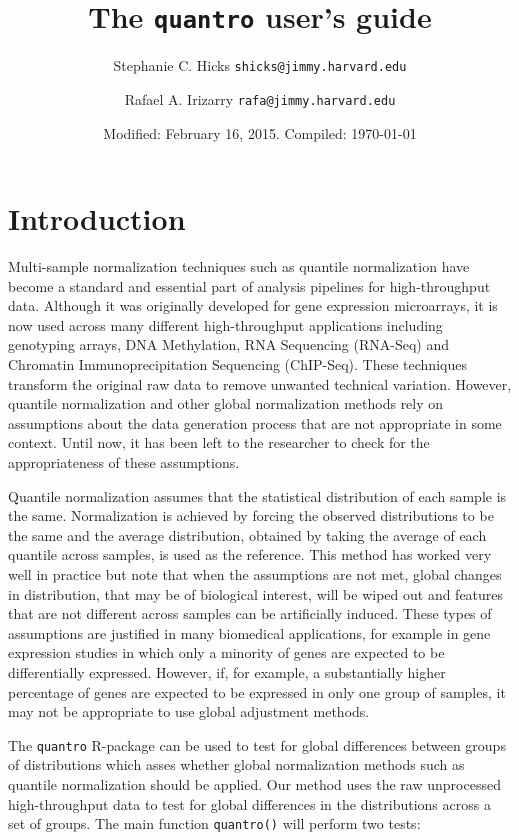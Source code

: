 \documentclass{article}\usepackage[]{graphicx}\usepackage[usenames,dvipsnames]{color}
\title{The \texttt{quantro} user's guide}
\author{Stephanie C. Hicks \texttt{shicks@jimmy.harvard.edu} \and
Rafael A. Irizarry \texttt{rafa@jimmy.harvard.edu} }
\date{Modified: February 16, 2015.  Compiled: \today}
\begin{document}
\maketitle
 
\tableofcontents

\section{Introduction}

Multi-sample normalization techniques such as quantile normalization 
\cite{Bolstad2003, Irizarry2003} have become a standard and essential part of 
analysis pipelines for high-throughput data. Although it was originally 
developed for gene expression microarrays, it is now used across many 
different high-throughput applications including genotyping arrays, DNA 
Methylation, RNA Sequencing (RNA-Seq) and Chromatin Immunoprecipitation 
Sequencing (ChIP-Seq). These techniques transform the original raw data to 
remove unwanted technical variation. However, quantile normalization and other 
global normalization methods rely on assumptions about the data generation 
process that are not appropriate in some context. Until now, it has been left 
to the researcher to check for the appropriateness of these assumptions. 

Quantile normalization assumes that the statistical distribution of each 
sample is the same. Normalization is achieved by forcing the observed 
distributions to be the same and the average distribution, obtained by taking 
the average of each quantile across samples, is used as the reference. This 
method has worked very well in practice but note that when the assumptions are 
not met, global changes in distribution, that may be of biological interest, 
will be wiped out and features that are not different across samples can be 
artificially induced.  These types of assumptions are justified in many 
biomedical applications, for example in gene expression studies in which only 
a minority of genes are expected to be differentially expressed. However, if, 
for example, a substantially higher percentage of genes are expected to be 
expressed in only one group of samples, it may not be appropriate to use 
global adjustment methods. 

The \texttt{quantro} R-package can be used to test for global differences 
between groups of distributions which asses whether global normalization 
methods such as quantile normalization should be applied. Our method uses 
the raw unprocessed high-throughput data to test for global differences in 
the distributions across a set of groups. The main function \texttt{quantro()} 
will perform two tests: 
\end{document}
